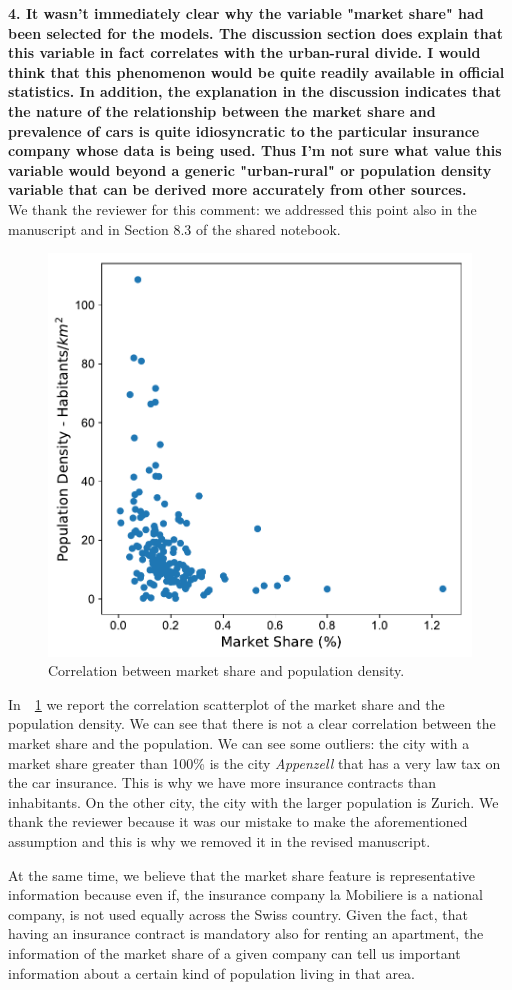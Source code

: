 \documentclass[12pt]{article}
\begin{document}
\textbf{4. It wasn't immediately clear why the variable "market share" had been selected for the models. The discussion section does explain that this variable in fact correlates with the urban-rural divide. I would think that this phenomenon would be quite readily available in official statistics. In addition, the explanation in the discussion indicates that the nature of the relationship between the market share and prevalence of cars is quite idiosyncratic to the particular insurance company whose data is being used. Thus I'm not sure what value this variable would beyond a generic "urban-rural" or population density variable that can be derived more accurately from other sources.}
\\
We thank the reviewer for this comment: we addressed this point also in the manuscript and in Section 8.3 of the shared notebook. 
\begin{figure}[h!]
    \centering
    \includegraphics[width=.5\linewidth]{figures/marketShareDensity.pdf}
\caption{Correlation between market share and population density.}
\label{fig:mshare}  
\end{figure}

In~\figurename~\ref{fig:mshare} we report the correlation scatterplot of the market share and the population density. We can see that there is not a clear correlation between the market share and the population.  We can see some outliers: the city with a market share greater than 100\% is the city \emph{Appenzell} that has a very law tax on the car insurance. This is why we have more insurance contracts than inhabitants. On the other city, the city with the larger population is Zurich. We thank the reviewer because it was our mistake to make the aforementioned assumption and this is why we removed it in the revised manuscript. 

At the same time, we believe that the market share feature is representative information because even if, the insurance company la Mobiliere is a national company, is not used equally across the Swiss country. Given the fact, that having an insurance contract is mandatory also for renting an apartment, the information of the market share of a given company can tell us important information about a certain kind of population living in that area. 
\end{document}
